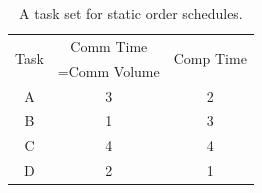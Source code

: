 \documentclass[sigconf]{acmart}
\begin{document}
\begin{table}[htb]
	\begin{center}
		
		\begin{tabular}{|c|c|c|}
			\hline
			\multirow{2}{*}{Task} & Comm Time & \multirow{2}{*}{Comp Time}\\ 
			&=Comm Volume& \\ \hline
			A & 3 & 2\\ \hline
			B & 1 & 3\\ \hline
			C & 4 & 4\\ \hline
			D & 2 & 1\\ \hline
		\end{tabular}
		\caption{\label{tab:staticOrderExample} A task set for static order schedules.}
	\end{center}
\end{table}
\end{document}
